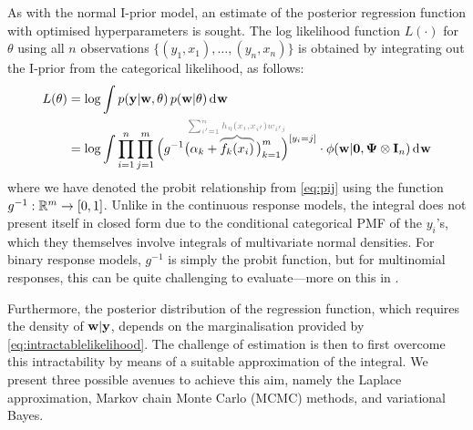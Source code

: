 
As with the normal I-prior model, an estimate of the posterior regression function with optimised hyperparameters is sought.
The log likelihood function $L(\cdot)$ for $\theta$ using all $n$ observations $\{(y_1,x_1),\dots,(y_n,x_n)\}$ is obtained by integrating out the I-prior from the categorical likelihood, as follows:
\begin{align}
  L(\theta) 
  &= \log \int p(\by | \bw, \theta) \, p(\bw|\theta) \dint \bw \nonumber \\
  &= \log \int \prod_{i=1}^n \prod_{j=1}^m \Big( g^{-1}\big(\alpha_k + 
  \greyoverbrace{f_k(x_i)}{\hidewidth\sum_{i'=1}^n h_\eta(x_i,x_{i'})w_{i'j}\hidewidth}
  \,\big)_{k=1}^m \Big)^{[y_i=j]} \cdot \phi(\bw|\bzero,  \bPsi \otimes \bI_n ) \dint \bw \label{eq:intractablelikelihood}
\end{align}
where we have denoted the probit relationship from \eqref{eq:pij} using the function $g^{-1}:\mathbb{R}^m \to [0,1]$.
Unlike in the continuous response models, the integral does not present itself in closed form due to the conditional categorical PMF of the $y_i$'s, which they themselves involve integrals of multivariate normal densities.
For binary response models, $g^{-1}$ is simply the probit function, but for multinomial responses, this can be quite challenging to evaluate---more on this in .

Furthermore, the posterior distribution of the regression function, which requires the density of ${\mathbf w}|{\mathbf y}$, depends on the marginalisation provided by \cref{eq:intractablelikelihood}.
The challenge of estimation is then to first overcome this intractability by means of a suitable approximation of the integral.
We present three possible avenues to achieve this aim, namely the Laplace approximation, Markov chain Monte Carlo (MCMC) methods, and  variational Bayes.



